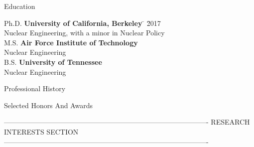 \documentclass{resume2} %
\begin{document}

\begin{rSection}{Education}

\begin{tabbing}
Ph.D. \hspace*{2 em}\= \textbf{University of California, Berkeley} \hspace*{5em} \= \hspace*{15em} \= 2017 \\
      \> Nuclear Engineering, with a minor in Nuclear Policy \\
%
M.S. \hspace*{2 em}\> \textbf{Air Force Institute of Technology} \>  \\
      \> Nuclear Engineering\\
%
B.S. \hspace*{2 em}\> \textbf{University of Tennessee} \>  \\
      \> Nuclear Engineering
\end{tabbing}
\end{rSection}

\begin{rSection}{Professional History}

\end{rSection}

\begin{rSection}{Selected Honors And Awards}

\end{rSection}

----------------------------------------------------------------------------------------
	RESEARCH INTERESTS SECTION
----------------------------------------------------------------------------------------
%

%
\end{document}
